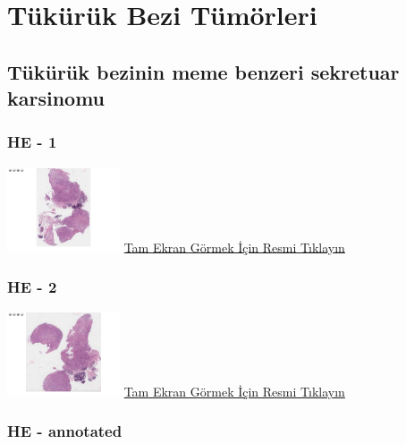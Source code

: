 \documentclass[
  letterpaper,
  DIV=11,
  numbers=noendperiod]{scrreprt}
\begin{document}
\hypertarget{sec-tukuruk-bezi-tumorleri}{%
\chapter{Tükürük Bezi Tümörleri}\label{sec-tukuruk-bezi-tumorleri}}

\hypertarget{tuxfckuxfcruxfck-bezinin-meme-benzeri-sekretuar-karsinomu}{%
\section{Tükürük bezinin meme benzeri sekretuar
karsinomu}\label{tuxfckuxfcruxfck-bezinin-meme-benzeri-sekretuar-karsinomu}}

\hypertarget{he---1-3}{%
\subsection{HE - 1}\label{he---1-3}}

\href{https://images.patolojiatlasi.com/mammary-analogue-secretory-carcinoma/HE1.html}{\includegraphics[width=0.25\textwidth,height=\textheight]{./screenshots/thumbnail_mammary-analogue-secretory-carcinoma1.png}}
\href{https://images.patolojiatlasi.com/mammary-analogue-secretory-carcinoma/HE1.html}{Tam
Ekran Görmek İçin Resmi Tıklayın}

\hypertarget{he---2-3}{%
\subsection{HE - 2}\label{he---2-3}}

\href{https://images.patolojiatlasi.com/mammary-analogue-secretory-carcinoma/HE2.html}{\includegraphics[width=0.25\textwidth,height=\textheight]{./screenshots/thumbnail_mammary-analogue-secretory-carcinoma2.png}}
\href{https://images.patolojiatlasi.com/mammary-analogue-secretory-carcinoma/HE2.html}{Tam
Ekran Görmek İçin Resmi Tıklayın}

\hypertarget{he---annotated-2}{%
\subsection{HE - annotated}\label{he---annotated-2}}
\end{document}

